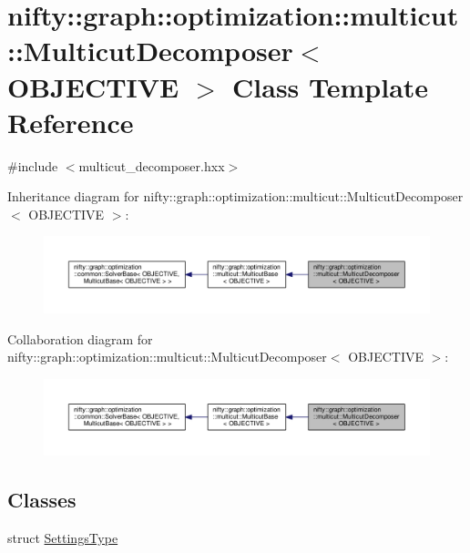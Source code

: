 \hypertarget{classnifty_1_1graph_1_1optimization_1_1multicut_1_1MulticutDecomposer}{}\section{nifty\+:\+:graph\+:\+:optimization\+:\+:multicut\+:\+:Multicut\+Decomposer$<$ O\+B\+J\+E\+C\+T\+I\+V\+E $>$ Class Template Reference}
\label{classnifty_1_1graph_1_1optimization_1_1multicut_1_1MulticutDecomposer}


{\ttfamily \#include $<$multicut\+\_\+decomposer.\+hxx$>$}



Inheritance diagram for nifty\+:\+:graph\+:\+:optimization\+:\+:multicut\+:\+:Multicut\+Decomposer$<$ O\+B\+J\+E\+C\+T\+I\+V\+E $>$\+:\nopagebreak
\begin{figure}[H]
\begin{center}
\leavevmode
\includegraphics[width=350pt]{classnifty_1_1graph_1_1optimization_1_1multicut_1_1MulticutDecomposer__inherit__graph}
\end{center}
\end{figure}


Collaboration diagram for nifty\+:\+:graph\+:\+:optimization\+:\+:multicut\+:\+:Multicut\+Decomposer$<$ O\+B\+J\+E\+C\+T\+I\+V\+E $>$\+:\nopagebreak
\begin{figure}[H]
\begin{center}
\leavevmode
\includegraphics[width=350pt]{classnifty_1_1graph_1_1optimization_1_1multicut_1_1MulticutDecomposer__coll__graph}
\end{center}
\end{figure}
\subsection*{Classes}
\begin{DoxyCompactItemize}
\item 
struct \hyperlink{structnifty_1_1graph_1_1optimization_1_1multicut_1_1MulticutDecomposer_1_1SettingsType}{Settings\+Type}
\end{DoxyCompactItemize}

